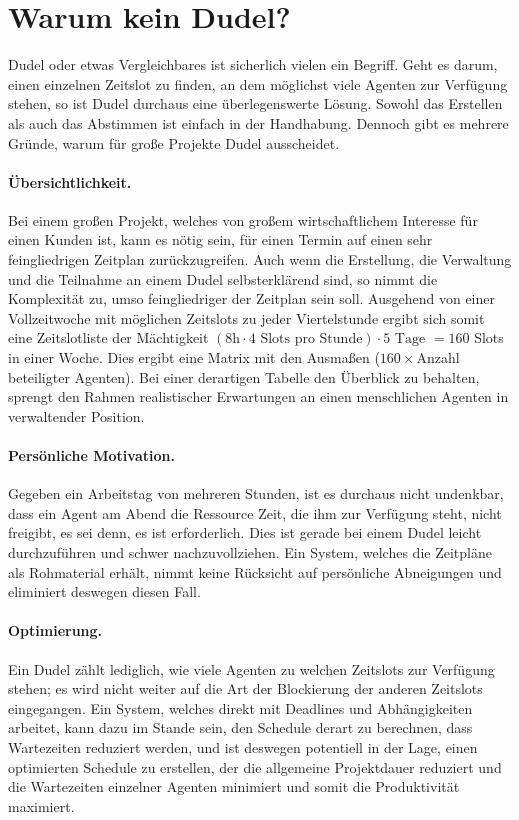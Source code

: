 \documentclass[12pt,twoside]{article}
\theoremstyle{plain}
\theoremstyle{definition}
\theoremstyle{remark}
\begin{document}
\section{Warum kein Dudel?}
\label{sec:dudel}
Dudel oder etwas Vergleichbares ist sicherlich vielen ein Begriff.
Geht es darum, einen einzelnen Zeitslot zu finden, an dem möglichst viele Agenten zur Verfügung stehen, so ist Dudel durchaus eine überlegenswerte Lösung.
Sowohl das Erstellen als auch das Abstimmen ist einfach in der Handhabung.
Dennoch gibt es mehrere Gründe, warum für große Projekte Dudel ausscheidet.
\paragraph{Übersichtlichkeit.}
Bei einem großen Projekt, welches von großem wirtschaftlichem Interesse für einen Kunden ist, kann es nötig sein, für einen Termin auf einen sehr feingliedrigen Zeitplan zurückzugreifen.
Auch wenn die Erstellung, die Verwaltung und die Teilnahme an einem Dudel selbsterklärend sind, so nimmt die Komplexität zu, umso feingliedriger der Zeitplan sein soll.
Ausgehend von einer Vollzeitwoche mit möglichen Zeitslots zu jeder Viertelstunde ergibt sich somit eine Zeitslotliste der Mächtigkeit $(8\text{h}\cdot4\text{ Slots pro Stunde})\cdot5\text{ Tage }=160$ Slots in einer Woche.
Dies ergibt eine Matrix mit den Ausmaßen ($160 \times$Anzahl beteiligter Agenten).
Bei einer derartigen Tabelle den Überblick zu behalten, sprengt den Rahmen realistischer Erwartungen an einen menschlichen Agenten in verwaltender Position.
\paragraph{Persönliche Motivation.}
Gegeben ein Arbeitstag von mehreren Stunden, ist es durchaus nicht undenkbar, dass ein Agent am Abend die Ressource Zeit, die ihm zur Verfügung steht, nicht freigibt, es sei denn, es ist erforderlich.
Dies ist gerade bei einem Dudel leicht durchzuführen und schwer nachzuvollziehen.
Ein System, welches die Zeitpläne als Rohmaterial erhält, nimmt keine Rücksicht auf persönliche Abneigungen und eliminiert deswegen diesen Fall.
\paragraph{Optimierung.}
Ein Dudel zählt lediglich, wie viele Agenten zu welchen Zeitslots zur Verfügung stehen; es wird nicht weiter auf die Art der Blockierung der anderen Zeitslots eingegangen.
Ein System, welches direkt mit Deadlines und Abhängigkeiten arbeitet, kann dazu im Stande sein, den Schedule derart zu berechnen, dass Wartezeiten reduziert werden, und ist deswegen potentiell in der Lage, einen optimierten Schedule zu erstellen, der die allgemeine Projektdauer reduziert und die Wartezeiten einzelner Agenten minimiert und somit die Produktivität maximiert.
\end{document}
